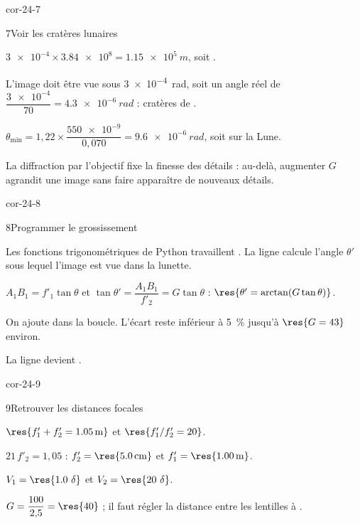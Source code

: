 \begin{blocLivre}{cor-24-7}
\begin{corrige}{7}{Voir les cratères lunaires}
\begin{questions}
\item $\num{3e-4}\times\num{3.84e8}=\qty{1,15e5}{m}$, soit .
\item L'image doit être vue sous \qty{3e-4}{rad}, soit un angle réel de $\dfrac{\num{3e-4}}{70}=\qty{4,3e-6}{rad}$ : cratères de
.
\item $\theta_\mathrm{min}=1{,}22\times\dfrac{\num{550e-9}}{0{,}070}=\qty{9,6e-6}{rad}$, soit  sur la Lune.
\item La diffraction par l'objectif fixe la finesse des détails : au-delà, augmenter $G$ agrandit une image
 sans faire apparaître de nouveaux détails.
\end{questions}
\end{corrige}
\end{blocLivre}
\begin{blocLivre}{cor-24-8}
\begin{corrige}{8}{Programmer le grossissement}
\begin{questions}
\item Les fonctions trigonométriques de Python travaillent . La ligne calcule l'angle $\theta'$ sous lequel
l'image est vue dans la lunette.
\item $A_1B_1=f'_1\tan\theta$ et $\tan\theta'=\dfrac{A_1B_1}{f'_2}=G\tan\theta$ : $\res{\theta'=\arctan(G\tan\theta)}$.
\item On ajoute  dans la boucle. L'écart reste inférieur à 5~\% jusqu'à
$\res{G=43}$ environ.
\item La ligne  devient .
\end{questions}
\end{corrige}
\end{blocLivre}
\begin{blocLivre}{cor-24-9}
\begin{corrige}{9}{Retrouver les distances focales}
\begin{questions}
\item $\res{f'_1+f'_2=\qty{1,05}{m}}$ et $\res{f'_1/f'_2=20}$.
\item $21\,f'_2=1{,}05$ : $f'_2=\res{\qty{5,0}{cm}}$ et $f'_1=\res{\qty{1,00}{m}}$.
\item $V_1=\res{\num{1,0}~\delta}$ et $V_2=\res{\num{20}~\delta}$.
\item $G=\dfrac{100}{2{,}5}=\res{40}$ ; il faut régler la distance entre les lentilles à .
\end{questions}
\end{corrige}
\end{blocLivre}
